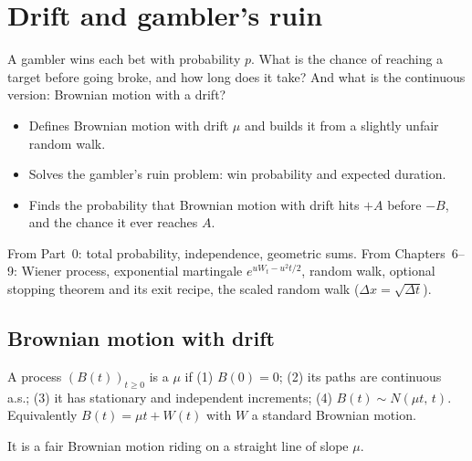 \chapter{Drift and gambler's ruin}
\label{ch:drift}

\begin{question}
A gambler wins each bet with probability $p$. What is the chance of reaching a target before going broke, and how long does it take? And what is the continuous version: Brownian motion with a drift?
\end{question}

\begin{whatfor}
\begin{itemize}
  \item Defines Brownian motion with drift $\mu$ and builds it from a slightly unfair random walk.
  \item Solves the gambler's ruin problem: win probability and expected duration.
  \item Finds the probability that Brownian motion with drift hits $+A$ before $-B$, and the chance it ever reaches $A$.
\end{itemize}
\end{whatfor}

\begin{prereq}
From Part~0: total probability, independence, geometric sums. From Chapters~6--9: Wiener process, exponential martingale $e^{uW_t-u^2t/2}$, random walk, optional stopping theorem and its exit recipe, the scaled random walk ($\Delta x=\sqrt{\Delta t}$).
\end{prereq}

\section{Brownian motion with drift}

\begin{definition}
\label{def:drift}
A process $(B(t))_{t\ge0}$ is a  $\mu$ if (1) $B(0)=0$; (2) its paths are continuous a.s.; (3) it has stationary and independent increments; (4) $B(t)\sim N(\mu t,\,t)$. Equivalently $B(t)=\mu t+W(t)$ with $W$ a standard Brownian motion.
\end{definition}

It is a fair Brownian motion riding on a straight line of slope $\mu$.

